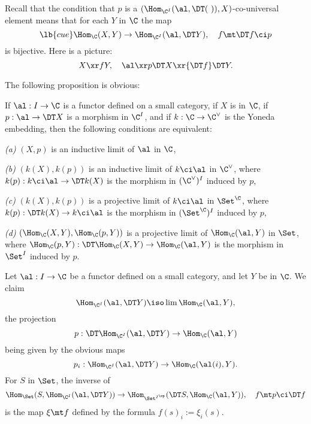 \documentclass[12pt]{article}
\theoremstyle{remark}
\theoremstyle{definition}
\begin{document}
Recall that the condition that $p$ is a $(\Hom_{\C^I}(\al,\DT(\ )),X)$\--co-universal element means that for each $Y$ in $\C$ the map 
\begin{equation}\lb{cue}
\Hom_\C(X,Y)\to\Hom_{\C^I}(\al,\DT Y),\quad f\mt\DT f\ci p
\end{equation}
is bijective. Here is a picture:
$$
X\xr fY,\quad\al\xr p\DT X\xr{\DT f}\DT Y.
$$

The following proposition is obvious:
%
\begin{prop}
If $\al:I\to\C$ is a functor defined on a small category, if $X$ is in $\C$, if $p:\al\to\DT X$ is a morphism in $\C^I$, and if $k:\C\to\C^\vee$ is the Yoneda embedding, then the following conditions are equivalent:

\nn\emph{(a)} $(X,p)$ is an inductive limit of $\al$ in $\C$,

\nn\emph{(b)} $(k(X),k(p))$ is an inductive limit of $k\ci\al$ in $\C^\vee$, where $k(p):k\ci\al\to\DT k(X)$ is the morphism in $(\C^\vee)^I$ induced by $p$,

\nn\emph{(c)} $(k(X),k(p))$ is a projective limit of $k\ci\al$ in $\Set^\C$, where $k(p):\DT k(X)\to k\ci\al$ is the morphism in $(\Set^\C)^I$ induced by $p$,

\nn\emph{(d)} $(\Hom_\C(X,Y),\Hom_\C(p,Y))$ is a projective limit of $\Hom_\C(\al,Y)$ in $\Set$, where $\Hom_\C(p,Y):\DT\Hom_\C(X,Y)\to\Hom_\C(\al,Y)$ is the morphism in $\Set^I$ induced by $p$.
\end{prop}


\begin{s}%
Let $\al:I\to\C$ be a functor defined on a small category, and let $Y$ be in $\C$. We claim 
$$%
\Hom_{\C^I}(\al,\DT Y)\iso\lim\Hom_\C(\al,Y),
$$%
the projection 
$$
p:\DT\Hom_{\C^I}(\al,\DT Y)\to\Hom_\C(\al,Y)
$$ 
being given by the obvious maps 
$$
p_i:\Hom_{\C^I}(\al,\DT Y)\to\Hom_\C(\al(i),Y).
$$ 
For $S$ in $\Set$, the inverse of 
$$
\Hom_\Set(S,\Hom_{\C^I}(\al,\DT Y))\to\Hom_{\Set^{I^{\op}}}(\DT S,\Hom_\C(\al,Y)),\quad f\mt p\ci\DT f
$$ 
is the map $\xi\mt f$ defined by the formula $f(s)_i:=\xi_i(s)$.
\end{s}

%
\end{document}
